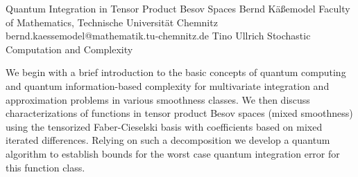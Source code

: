 \begin{talk}
  {Quantum Integration in Tensor Product  Besov Spaces}%
  {Bernd K\"a{\ss}emodel}%
  {Faculty of Mathematics, Technische Universit\"at Chemnitz}%
  {bernd.kaessemodel@mathematik.tu-chemnitz.de}%
  {Tino Ullrich}%
  {Stochastic Computation and Complexity}%
    

We begin with a brief introduction to the basic concepts of quantum computing and quantum information-based complexity for multivariate integration and approximation problems in various smoothness classes. We then discuss characterizations of functions in tensor product Besov spaces (mixed smoothness) using the tensorized Faber-Cieselski basis with coefficients based on mixed iterated differences. Relying on such a decomposition we develop a quantum algorithm to establish bounds for the worst case quantum integration error for this function class. 

\medskip
%
%
\end{talk}

